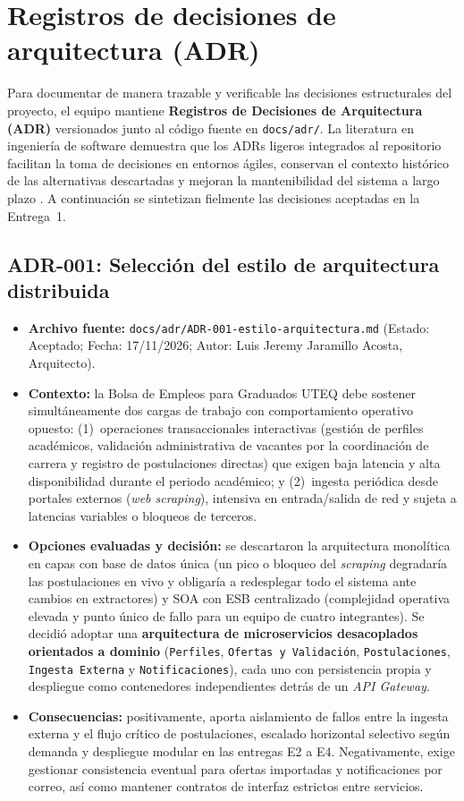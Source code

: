 \documentclass[11pt,a4paper]{article}
\begin{document}
\section{Registros de decisiones de arquitectura (ADR)}

Para documentar de manera trazable y verificable las decisiones estructurales del proyecto, el equipo mantiene \textbf{Registros de Decisiones de Arquitectura (ADR)} versionados junto al código fuente en \texttt{docs/adr/}. La literatura en ingeniería de software demuestra que los ADRs ligeros integrados al repositorio facilitan la toma de decisiones en entornos ágiles, conservan el contexto histórico de las alternativas descartadas y mejoran la mantenibilidad del sistema a largo plazo \cite{keeling2022,buchgeher2023}. A continuación se sintetizan fielmente las decisiones aceptadas en la Entrega~1.

\subsection{ADR-001: Selección del estilo de arquitectura distribuida}

\begin{itemize}
    \item \textbf{Archivo fuente:} \texttt{docs/adr/ADR-001-estilo-arquitectura.md} (Estado: Aceptado; Fecha: 17/11/2026; Autor: Luis Jeremy Jaramillo Acosta, Arquitecto).
    \item \textbf{Contexto:} la Bolsa de Empleos para Graduados UTEQ debe sostener simultáneamente dos cargas de trabajo con comportamiento operativo opuesto: (1)~operaciones transaccionales interactivas (gestión de perfiles académicos, validación administrativa de vacantes por la coordinación de carrera y registro de postulaciones directas) que exigen baja latencia y alta disponibilidad durante el periodo académico; y (2)~ingesta periódica desde portales externos (\textit{web scraping}), intensiva en entrada/salida de red y sujeta a latencias variables o bloqueos de terceros.
    \item \textbf{Opciones evaluadas y decisión:} se descartaron la arquitectura monolítica en capas con base de datos única (un pico o bloqueo del \textit{scraping} degradaría las postulaciones en vivo y obligaría a redesplegar todo el sistema ante cambios en extractores) y SOA con ESB centralizado (complejidad operativa elevada y punto único de fallo para un equipo de cuatro integrantes). Se decidió adoptar una \textbf{arquitectura de microservicios desacoplados orientados a dominio} (\texttt{Perfiles}, \texttt{Ofertas y Validación}, \texttt{Postulaciones}, \texttt{Ingesta Externa} y \texttt{Notificaciones}), cada uno con persistencia propia y despliegue como contenedores independientes detrás de un \textit{API Gateway}.
    \item \textbf{Consecuencias:} positivamente, aporta aislamiento de fallos entre la ingesta externa y el flujo crítico de postulaciones, escalado horizontal selectivo según demanda y despliegue modular en las entregas E2 a E4. Negativamente, exige gestionar consistencia eventual para ofertas importadas y notificaciones por correo, así como mantener contratos de interfaz estrictos entre servicios.
\end{itemize}
\end{document}

